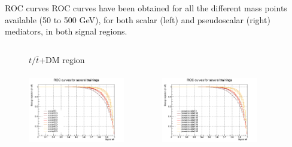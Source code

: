 \documentclass[8pt]{beamer}
\begin{document}
\begin{frame}{ROC curves}
\justifying
\alert{ROC curves have been obtained} for all the different mass points available (50 to 500 GeV), for both scalar (left) and pseudoscalar (right) mediators, in both signal regions. \vfill
\vspace{-5pt}

\begin{figure}[htbp]
\centering
\begin{columns}
\begin{column}{1.09\textwidth}
\begin{block}{\centering $t/\bar t$+DM region}\end{block} \vspace{10pt}
\end{column}
\end{columns} \vspace{-16pt}

\begin{columns}
\begin{column}[b]{.50\textwidth}
\begin{center}
\includegraphics[width=4.2cm, height=3.2cm]{figs/groupedROC_scalar_ST.png}
\end{center}
\end{column} \hfill
\begin{column}[b]{.50\textwidth}
\begin{center}
\includegraphics[width=4.2cm, height=3.2cm]{figs/groupedROC_pseudo_ST.png}
\end{center}
\end{column} \hfill
\end{columns} \vfill
\vspace{-5pt}


\end{figure}
\end{frame}
\end{document}
